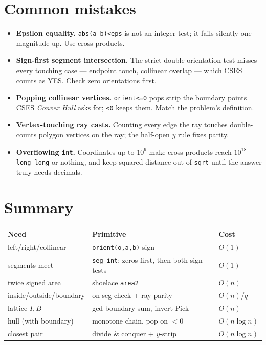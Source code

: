 \section{Common mistakes}
\begin{itemize}
\item \textbf{Epsilon equality.} \texttt{abs(a-b)<eps} is not an
integer test; it fails silently one magnitude up. Use cross
products.
\item \textbf{Sign-first segment intersection.} The strict
double-orientation test misses every touching case --- endpoint
touch, collinear overlap --- which CSES counts as YES. Check
zero orientations first.
\item \textbf{Popping collinear vertices.} \texttt{orient<=0}
pops strip the boundary points CSES \emph{Convex Hull} asks
for; \texttt{<0} keeps them. Match the problem's definition.
\item \textbf{Vertex-touching ray casts.} Counting every edge
the ray touches double-counts polygon vertices on the ray; the
half-open $y$ rule fixes parity.
\item \textbf{Overflowing \texttt{int}.} Coordinates up to
$10^9$ make cross products reach $10^{18}$ --- \texttt{long
long} or nothing, and keep squared distance out of
\texttt{sqrt} until the answer truly needs decimals.
\end{itemize}

\section*{Summary}
\begin{tabularx}{\linewidth}{@{}lXl@{}}
\textbf{Need} & \textbf{Primitive} & \textbf{Cost}\\
\midrule
left/right/collinear & \texttt{orient(o,a,b)} sign & $O(1)$\\
segments meet & \texttt{seg\_int}: zeros first, then both sign tests & $O(1)$\\
twice signed area & shoelace \texttt{area2} & $O(n)$\\
inside/outside/boundary & on-seg check + ray parity & $O(n)$/$q$\\
lattice $I,B$ & gcd boundary sum, invert Pick & $O(n)$\\
hull (with boundary) & monotone chain, pop on $<0$ & $O(n\log n)$\\
closest pair & divide \& conquer + $y$-strip & $O(n\log n)$\\
\end{tabularx}

